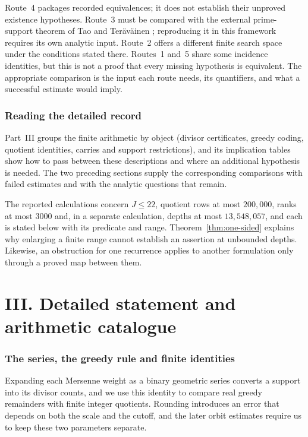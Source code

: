 \documentclass[11pt]{article}
\theoremstyle{plain}
\theoremstyle{definition}
\theoremstyle{remark}
\begin{document}
Route~4 packages recorded equivalences; it does not establish their
unproved existence hypotheses.  Route~3 must be compared with the external
prime-support theorem of Tao and Ter\"av\"ainen
\cite[Theorem~1.3]{taoteravainen2025}; reproducing it in this framework
requires its own analytic input.  Route~2 offers a different finite
search space under the conditions stated there.  Routes~1 and~5 share
some incidence identities, but this is not a proof that every missing
hypothesis is equivalent.  The appropriate comparison is the input each
route needs, its quantifiers, and what a successful estimate would imply.

\section{Reading the detailed record}
\label{sec:257-howto}
Part~III groups the finite arithmetic by object (divisor certificates,
greedy coding, quotient identities, carries and support restrictions),
and its implication tables show how to pass between these descriptions
and where an additional hypothesis is needed. The two preceding
sections supply the corresponding comparisons with failed estimates and
with the analytic questions that remain.

The reported calculations concern $J\le22$, quotient rows at most
$200{,}000$, ranks at most $3000$ and, in a separate calculation, depths
at most $13{,}548{,}057$, and each is stated below with its predicate
and range. Theorem~\ref{thm:one-sided} explains why enlarging a finite
range cannot establish an assertion at unbounded depths. Likewise, an
obstruction for one recurrence applies to another formulation only
through a proved map between them.
\clearpage
\part*{III. Detailed statement and arithmetic catalogue}
\section{The series, the greedy rule and finite identities}
Expanding each Mersenne weight as a binary geometric series converts a
support into its divisor counts, and we use this identity to compare
real greedy remainders with finite integer quotients. Rounding
introduces an error that depends on both the scale and the cutoff, and
the later orbit estimates require us to keep these two parameters
separate.
\end{document}
